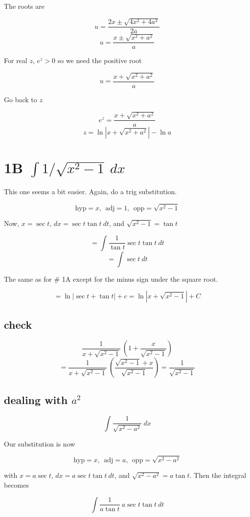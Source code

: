 \documentclass[11pt, oneside]{article}
\begin{document}
The roots are

\[ u = \frac{2x  \pm \sqrt{4x^2 + 4a^2}}{2a} \]
\[ u = \frac{x  \pm \sqrt{x^2 + a^2}}{a} \]

For real $z$, $e^z > 0$ so we need the positive root

\[ u = \frac{x  + \sqrt{x^2 + a^2}}{a} \]

Go back to $z$

\[ e^z = \frac{x  + \sqrt{x^2 + a^2}}{a} \]
\[ z = \ln |x  + \sqrt{x^2 + a^2}| - \ln a \]

\section*{1B $\int 1/\sqrt{x^2 - 1} \ dx$}

This one seems a bit easier.  Again, do a trig substitution.  

\[ \text{hyp} = x, \ \ \text{adj} = 1, \ \ \text{opp} = \sqrt{x^2 - 1}   \]

Now, $x = \sec t$, $dx = \sec t \tan t \ dt$, and $\sqrt{x^2 - 1} = \tan t$

\[ = \int \frac{1}{\tan t} \sec t \tan t \ dt \]
\[ = \int \sec t \ dt \]

The same as for \# 1A except for the minus sign under the square root.

\[ = \ln | \sec t + \tan t | + c = \ln | x + \sqrt{x^2 - 1} | + C \]

\subsection*{check}

\[ \frac{1}{x + \sqrt{x^2-1}} \ (1 + \frac{x}{\sqrt{x^2-1}} ) \]
\[ = \frac{1}{x + \sqrt{x^2-1}} \ (\frac{\sqrt{x^2-1} + x}{\sqrt{x^2-1}}  ) = \frac{1}{\sqrt{x^2-1}}\]

\subsection*{dealing with $a^2$}

\[ \int \frac{1}{\sqrt{x^2 - a^2}} \ dx \]

Our substitution is now

\[ \text{hyp} = x, \ \ \text{adj} = a, \ \ \text{opp} = \sqrt{x^2 - a^2}   \]

with $x = a \sec t$, $dx = a \sec t \tan t \ dt$, and $\sqrt{x^2 - a^2} = a \tan t$.  Then the integral becomes 

\[ \int \frac{1}{a \tan t} \ a \sec t \tan t \ dt \]
\end{document}
